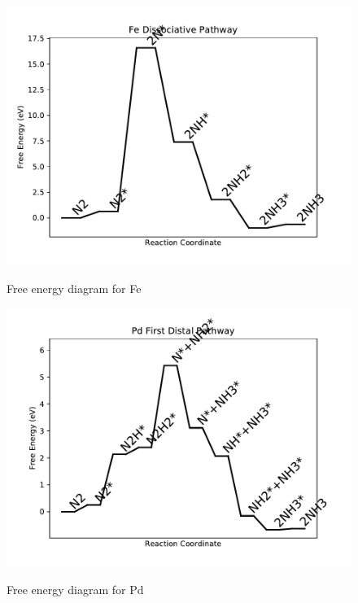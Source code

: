 \documentclass{article}
\begin{document}
\newpage
\begin{figure}
\includegraphics[width=1\linewidth]{data/plots/Fe_dissociative.pdf}
\label{fig:Fe_dissociative}
\caption{Free energy diagram for Fe}
\end{figure}

\begin{figure}
\includegraphics[width=1\linewidth]{data/plots/Pd_distal_1.pdf}
\label{fig:Pd_distal_1}
\caption{Free energy diagram for Pd}
\end{figure}
\end{document}
